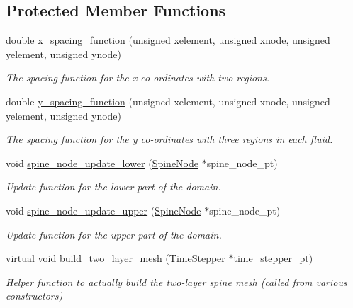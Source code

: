 \subsection*{Protected Member Functions}
\begin{DoxyCompactItemize}
\item 
double \hyperlink{classoomph_1_1TwoLayerSpineMesh_a5fd9eae27ba19788e0b397936f0c5ead}{x\+\_\+spacing\+\_\+function} (unsigned xelement, unsigned xnode, unsigned yelement, unsigned ynode)
\begin{DoxyCompactList}\small\item\em The spacing function for the x co-\/ordinates with two regions. \end{DoxyCompactList}\item 
double \hyperlink{classoomph_1_1TwoLayerSpineMesh_a2d05d5228e3831021ab48dd429ada890}{y\+\_\+spacing\+\_\+function} (unsigned xelement, unsigned xnode, unsigned yelement, unsigned ynode)
\begin{DoxyCompactList}\small\item\em The spacing function for the y co-\/ordinates with three regions in each fluid. \end{DoxyCompactList}\item 
void \hyperlink{classoomph_1_1TwoLayerSpineMesh_a7973ed642b9adff26bf531c76dade747}{spine\+\_\+node\+\_\+update\+\_\+lower} (\hyperlink{classoomph_1_1SpineNode}{Spine\+Node} $\ast$spine\+\_\+node\+\_\+pt)
\begin{DoxyCompactList}\small\item\em Update function for the lower part of the domain. \end{DoxyCompactList}\item 
void \hyperlink{classoomph_1_1TwoLayerSpineMesh_adc173b7505ec801a4aa688f97ffe55e0}{spine\+\_\+node\+\_\+update\+\_\+upper} (\hyperlink{classoomph_1_1SpineNode}{Spine\+Node} $\ast$spine\+\_\+node\+\_\+pt)
\begin{DoxyCompactList}\small\item\em Update function for the upper part of the domain. \end{DoxyCompactList}\item 
virtual void \hyperlink{classoomph_1_1TwoLayerSpineMesh_ada5471a89c3ac91a606b3e5dcc1325cd}{build\+\_\+two\+\_\+layer\+\_\+mesh} (\hyperlink{classoomph_1_1TimeStepper}{Time\+Stepper} $\ast$time\+\_\+stepper\+\_\+pt)
\begin{DoxyCompactList}\small\item\em Helper function to actually build the two-\/layer spine mesh (called from various constructors) \end{DoxyCompactList}\end{DoxyCompactItemize}
